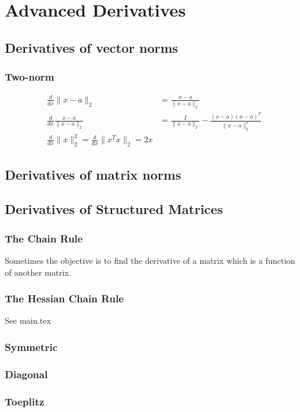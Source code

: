 \documentclass[oneside]{book}
\begin{document}
\chapter{Advanced Derivatives}

\section{Derivatives of vector norms}

\subsection{Two-norm}
\begin{align}
   \frac{d}{dx}\|x-a\|_2 &= \frac{x-a}{\|x-a\|_2}
   \\
   \frac{d}{dx}\frac{x-a}{\|x-a\|_2} &= \frac{I}{\|x-a\|_2} - \frac{(x-a)(x-a)^T}{\|x-a\|_2^3}
   \\
   \frac{d}{dx}\|x\|_2^2 = \frac{d}{dx}\|x^T x\|_2 = 2x
\end{align}

\section{Derivatives of matrix norms}

\section{Derivatives of Structured Matrices}
\subsection{The Chain Rule}
Sometimes the objective is to find the derivative of a matrix which is a function of another matrix.

\subsection{The Hessian Chain Rule}
See main.tex

\subsection{Symmetric}
\subsection{Diagonal}
\subsection{Toeplitz}
\end{document}
